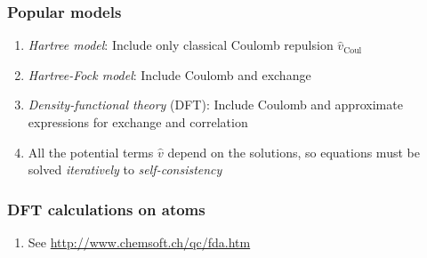 \documentclass[11pt]{article}
\begin{document}
\subsubsection{Popular models}
\label{sec:org58d8c4b}
\begin{enumerate}
\item \emph{Hartree model}: Include only classical Coulomb repulsion \(\hat v_\mathrm{Coul}\)
\item \emph{Hartree-Fock model}: Include Coulomb and exchange
\item \emph{Density-functional theory} (DFT): Include Coulomb and
approximate expressions for exchange and correlation
\item All the potential terms \(\hat v\) depend on the solutions, so equations
must be solved \emph{iteratively} to \emph{self-consistency}
\end{enumerate}
\subsubsection{DFT calculations on atoms}
\label{sec:org35e9e1a}
\begin{enumerate}
\item See \url{http://www.chemsoft.ch/qc/fda.htm}
\end{enumerate}
\end{document}
